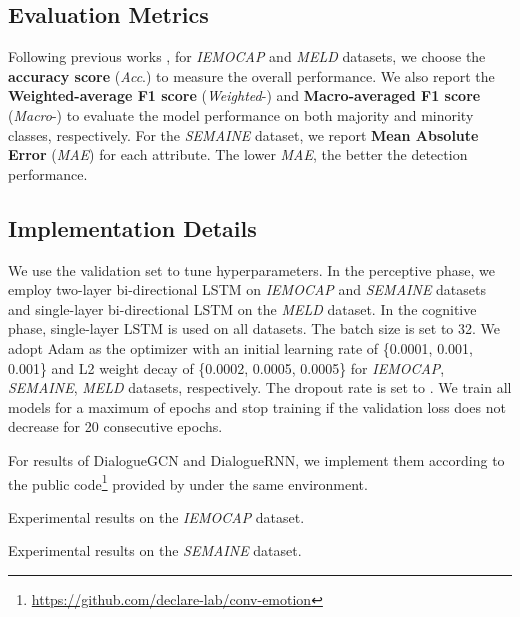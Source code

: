 \documentclass[11pt,a4paper]{article}
\begin{document}
\subsection{Evaluation Metrics}
Following previous works  \cite{DBLP:conf/emnlp/HazarikaPMCZ18,DBLP:conf/aaai/JiaoLK20}, for {\it IEMOCAP} and {\it MELD} datasets, we choose the {\bf accuracy score} ({\it Acc}.) to measure the overall performance. We also report the {\bf Weighted-average F1 score} ({\it Weighted}-) and {\bf Macro-averaged F1 score} ({\it Macro}-) to evaluate the model performance on both majority and minority classes, respectively. 
For the {\it SEMAINE} dataset, we report {\bf Mean Absolute Error} ({\it MAE}) for each attribute. The lower {\it MAE}, the better the detection performance.




\subsection{Implementation Details}
We use the validation set to tune hyperparameters. 
In the perceptive phase, we employ two-layer bi-directional LSTM on {\it IEMOCAP} and {\it SEMAINE} datasets and single-layer bi-directional LSTM on the {\it MELD} dataset.   In the cognitive phase, single-layer LSTM is used on all datasets.
The batch size is set to 32.
We adopt Adam \cite{DBLP:journals/corr/KingmaB14} as the optimizer with an initial learning rate of \{0.0001, 0.001, 0.001\} and L2 weight decay of \{0.0002, 0.0005, 0.0005\} for {\it IEMOCAP}, {\it SEMAINE}, {\it MELD} datasets, respectively. 
The dropout rate is set to .  
We train all models for a maximum of  epochs and stop training if the validation loss does not decrease for 20 consecutive epochs. 


For results of DialogueGCN and DialogueRNN, we implement them according to the public code\footnote{\url{https://github.com/declare-lab/conv-emotion}} provided by \citet{DBLP:conf/aaai/MajumderPHMGC19,DBLP:conf/emnlp/GhosalMPCG19} under the same environment. 





\begin{table}[t]
  \centering
  \caption{Experimental results on the {\it IEMOCAP} dataset. } \label{tab:iemocap}
\end{table}
  

\begin{table}[t]
\centering
    \resizebox{0.99\linewidth}{!}{}
\caption{Experimental results on the {\it SEMAINE} dataset. } \label{tab:semaine}
\end{table}
\end{document}
